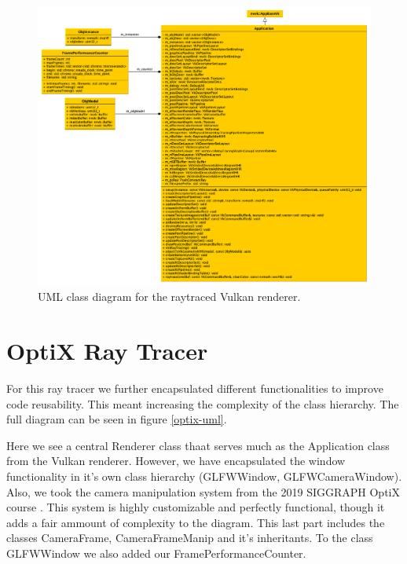 \begin{figure}[hbt!]
  \centering
  \includegraphics[width=\textwidth]{figuras/vulkan-rt-uml.png}
  \caption{UML class diagram for the raytraced Vulkan renderer.}
  \label{vulkan-rt-uml}
\end{figure}

\clearpage
\section{OptiX Ray Tracer}
For this ray tracer we further encapsulated different functionalities to improve code reusability. This meant increasing the complexity of the class hierarchy. The full diagram can be seen in figure \ref{optix-uml}. 

Here we see a central Renderer class thaat serves much as the Application class from the Vulkan renderer. However, we have encapsulated the window functionality in it's own class hierarchy (GLFWWindow, GLFWCameraWindow). Also, we took the camera manipulation system from the 2019 SIGGRAPH OptiX course \cite{OptixCourse}. This system is highly customizable and perfectly functional, though it adds a fair ammount of complexity to the diagram. This last part includes the classes CameraFrame, CameraFrameManip and it's inheritants. To the class GLFWWindow we also added our FramePerformanceCounter.

